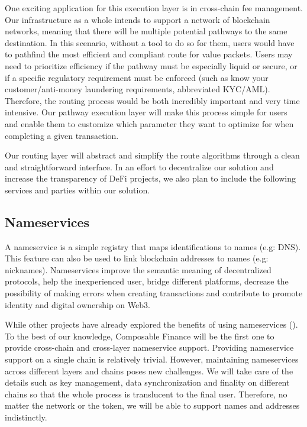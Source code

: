 One exciting application for this execution layer is in cross-chain fee management. Our infrastructure as a whole intends to support a network of blockchain networks, meaning that there will be multiple potential pathways to the same destination. In this scenario, without a tool to do so for them, users would have to pathfind the most efficient and compliant route for value packets. Users may need to prioritize efficiency if the pathway must be especially liquid or secure, or if a specific regulatory requirement must be enforced (such as know your customer/anti-money laundering requirements, abbreviated KYC/AML). Therefore, the routing process would be both incredibly important and very time intensive. Our pathway execution layer will make this process simple for users and enable them to customize which parameter they want to optimize for when completing a given transaction.

Our routing layer will abstract and simplify the route algorithms through a clean and straightforward interface. In an effort to decentralize our solution and increase the transparency of DeFi projects, we also plan to include the following services and parties within our solution.

\subsection{Nameservices}
A nameservice is a simple registry that maps identifications to names (e.g: DNS). This feature can also be used to link blockchain addresses to names (e.g: nicknames). Nameservices improve the semantic meaning of decentralized protocols, help the inexperienced user, bridge different platforms, decrease the possibility of making errors when creating transactions and contribute to promote identity and digital ownership on Web3.

While other projects have already explored the benefits of using nameservices (). To the best of our knowledge, Composable Finance will be the first one to provide cross-chain and cross-layer nameservice support. Providing nameservice support on a single chain is relatively trivial. However, maintaining nameservices across different layers and chains poses new challenges. We will take care of the details such as key management, data synchronization and finality on different chains so that the whole process is translucent to the final user. Therefore, no matter the network or the token, we will be able to support names and addresses indistinctly.

